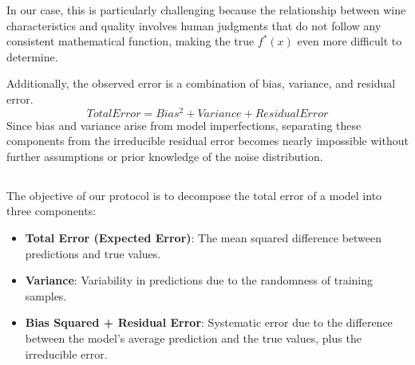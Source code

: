 \documentclass[a4paper,10pt]{article}
\begin{document}
    In our case, this is particularly challenging because the relationship between wine characteristics and quality involves human judgments that do not follow any consistent mathematical function, making the true $f^*(x)$ even more difficult to determine. 
    
    Additionally, the observed error is a combination of bias, variance, and residual error. \[ Total Error = Bias^2 + Variance + ResidualError\] Since bias and variance arise from model imperfections, separating these components from the irreducible residual error becomes nearly impossible without further assumptions or prior knowledge of the noise distribution.
    


\subsection{}

The objective of our protocol is to decompose the total error of a model into three components:
\begin{itemize}
    \item \textbf{Total Error (Expected Error)}: The mean squared difference between predictions and true values.
    \item \textbf{Variance}: Variability in predictions due to the randomness of training samples.
    \item \textbf{Bias Squared + Residual Error}: Systematic error due to the difference between the model's average prediction and the true values, plus the irreducible error.
\end{itemize}
\end{document}
